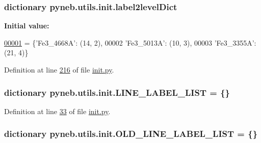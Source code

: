 \hypertarget{namespacepyneb_1_1utils_1_1init_a7dacd254fb434e414b2792c54049616c}{
\subsubsection[{label2level\-Dict}]{\setlength{\rightskip}{0pt plus 5cm}dictionary pyneb.\-utils.\-init.\-label2level\-Dict}}\label{namespacepyneb_1_1utils_1_1init_a7dacd254fb434e414b2792c54049616c}
{\bfseries Initial value\-:}
\begin{DoxyCode}
\hypertarget{namespacepyneb_1_1utils_1_1init_l00001}{}\hyperlink{namespacepyneb_1_1utils_1_1init}{00001} = \{\textcolor{stringliteral}{'Fe3\_4668A'}: (14, 2), 
00002                    \textcolor{stringliteral}{'Fe3\_5013A'}: (10, 3),
00003                    \textcolor{stringliteral}{'Fe3\_3355A'}: (21, 4)\}
\end{DoxyCode}


Definition at line \hyperlink{init_8py_source_l00216}{216} of file \hyperlink{init_8py_source}{init.\-py}.

\hypertarget{namespacepyneb_1_1utils_1_1init_a2db1385e0dfb34bdc19ec2e7491041b3}{
\subsubsection[{L\-I\-N\-E\-\_\-\-L\-A\-B\-E\-L\-\_\-\-L\-I\-S\-T}]{\setlength{\rightskip}{0pt plus 5cm}dictionary pyneb.\-utils.\-init.\-L\-I\-N\-E\-\_\-\-L\-A\-B\-E\-L\-\_\-\-L\-I\-S\-T = \{\}}}\label{namespacepyneb_1_1utils_1_1init_a2db1385e0dfb34bdc19ec2e7491041b3}


Definition at line \hyperlink{init_8py_source_l00033}{33} of file \hyperlink{init_8py_source}{init.\-py}.

\hypertarget{namespacepyneb_1_1utils_1_1init_aae3ff006599d45be21cb0b2753f14802}{
\subsubsection[{O\-L\-D\-\_\-\-L\-I\-N\-E\-\_\-\-L\-A\-B\-E\-L\-\_\-\-L\-I\-S\-T}]{\setlength{\rightskip}{0pt plus 5cm}dictionary pyneb.\-utils.\-init.\-O\-L\-D\-\_\-\-L\-I\-N\-E\-\_\-\-L\-A\-B\-E\-L\-\_\-\-L\-I\-S\-T = \{\}}}\label{namespacepyneb_1_1utils_1_1init_aae3ff006599d45be21cb0b2753f14802}


